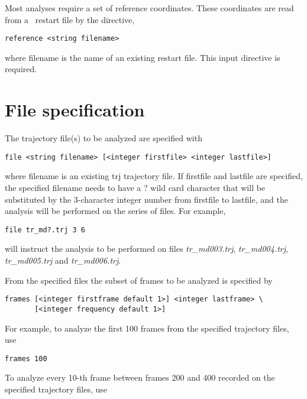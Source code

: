 Most analyses require a set of reference coordinates. These
coordinates are read from a \nwchem\ restart file by the directive,

\begin{verbatim}
reference <string filename>
\end{verbatim}

where {\rm filename} is the name of an existing restart file. 
This input directive is required.

\section{File specification}

The trajectory file(s) to be analyzed are specified with

\begin{verbatim}
file <string filename> [<integer firstfile> <integer lastfile>] 
\end{verbatim}

where {\rm filename} is an existing {\rm trj} trajectory file.
If {\rm firstfile} and {\rm lastfile} are specified, the specified
{\rm filename} needs to have a {\rm ?} wild card character that will 
be substituted by the 3-character integer number from {\rm firstfile} 
to {\rm lastfile}, and the analysis will be performed on the series 
of files.
For example,

\begin{verbatim}
file tr_md?.trj 3 6
\end{verbatim}

will instruct the analysis to be performed on files {\it tr\_md003.trj},
{\it tr\_md004.trj}, {\it tr\_md005.trj} and {\it tr\_md006.trj}.

\par
From the specified files the subset of frames to be analyzed is 
specified by

\begin{verbatim}
frames [<integer firstframe default 1>] <integer lastframe> \
       [<integer frequency default 1>]
\end{verbatim}

For example, to analyze the first 100 frames from the specified
trajectory files, use

\begin{verbatim}
frames 100
\end{verbatim}

To analyze every 10-th frame between frames 200 and 400 recorded on
the specified trajectory files, use

